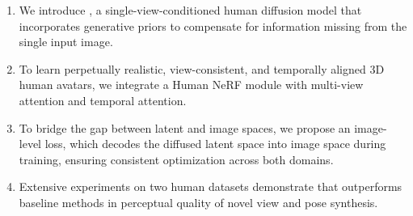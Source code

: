 \begin{enumerate}
    \item We introduce \nickname{}, a single-view-conditioned human diffusion model that incorporates generative priors to compensate for information missing from the single input image.
    \item To learn perpetually realistic, view-consistent, and temporally aligned 3D human avatars, we integrate a Human NeRF module with multi-view attention and temporal attention. 
    \item To bridge the gap between latent and image spaces, we propose an image-level loss, which decodes the diffused latent space into image space during training, ensuring consistent optimization across both domains.
    \item Extensive experiments on two human datasets demonstrate that \nickname{} outperforms baseline methods in perceptual quality of novel view and pose synthesis.
\end{enumerate}







